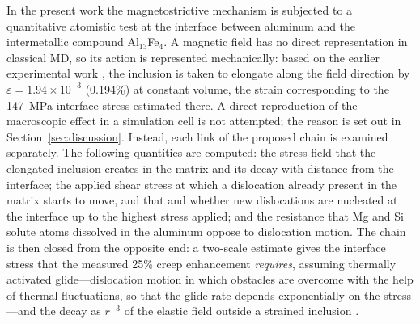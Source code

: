 In the present work the magnetostrictive mechanism is subjected to a
quantitative atomistic test at the interface between aluminum and the
intermetallic compound Al$_{13}$Fe$_4$. A magnetic field has no direct
representation in classical MD, so its action is represented mechanically:
based on the earlier experimental work \cite{Friha2024JMMM}, the inclusion
is taken to elongate along the field direction by
$\varepsilon=1.94\times10^{-3}$ (0.194\%) at constant volume, the strain
corresponding to the 147~MPa interface stress estimated there. A direct
reproduction of the macroscopic effect in a simulation cell is not attempted;
the reason is set out in Section~\ref{sec:discussion}. Instead, each link of
the proposed chain is examined separately. The following quantities are
computed: the stress field that the elongated inclusion creates in the matrix
and its decay with distance from the interface; the applied shear stress at
which a dislocation already present in the matrix starts to move, and that
and whether new dislocations are nucleated at the interface up to the highest stress applied; and the resistance
that Mg and Si solute atoms dissolved in the aluminum oppose to dislocation
motion. The chain is then closed from the opposite end: a two-scale estimate
gives the interface stress that the measured 25\% creep enhancement
\emph{requires}, assuming thermally activated glide---dislocation motion in
which obstacles are overcome with the help of thermal fluctuations, so that
the glide rate depends exponentially on the stress---and the decay as
$r^{-3}$ of the elastic field outside a strained inclusion
\cite{Eshelby1957}.